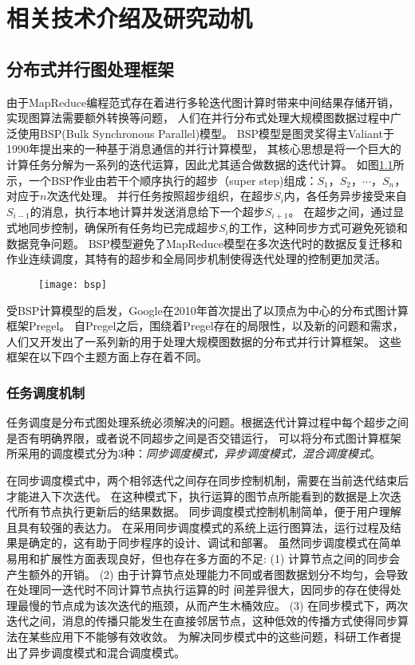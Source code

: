 \chapter{相关技术介绍及研究动机}
\section{分布式并行图处理框架}
由于MapReduce编程范式存在着进行多轮迭代图计算时带来中间结果存储开销，实现图算法需要额外转换等问题，
人们在并行分布式处理大规模图数据过程中广泛使用BSP(Bulk Synchronous Parallel)模型\cite{bsp@1990}。
BSP模型是图灵奖得主Valiant于1990年提出来的一种基于消息通信的并行计算模型，
其核心思想是将一个巨大的计算任务分解为一系列的迭代运算，因此尤其适合做数据的迭代计算。
如图\ref{fig:bsp}所示，一个BSP作业由若干个顺序执行的超步（super step)组成：$S_1，S_2，\cdots，S_n$，对应于$n$次迭代处理。
并行任务按照超步组织，在超步$S_i$内，各任务异步接受来自$S_{i-1}$的消息，执行本地计算并发送消息给下一个超步$S_{i+1}$。
在超步之间，通过显式地同步控制，确保所有任务均已完成超步$S_i$的工作，这种同步方式可避免死锁和数据竞争问题。
BSP模型避免了MapReduce模型在多次迭代时的数据反复迁移和作业连续调度，其特有的超步和全局同步机制使得迭代处理的控制更加灵活。

\begin{figure}[!htbp]
  \centering
  \texttt{[image: bsp]}
  \label{fig:bsp}
\end{figure}

受BSP计算模型的启发，Google在2010年首次提出了以顶点为中心的分布式图计算框架Pregel\cite{Malewicz@SIGMOD10}。
自Pregel之后，围绕着Pregel存在的局限性，以及新的问题和需求，人们又开发出了一系列新的用于处理大规模图数据的分布式并行计算框架。
这些框架在以下四个主题方面上存在着不同。

\subsection{任务调度机制}
任务调度是分布式图处理系统必须解决的问题。根据迭代计算过程中每个超步之间是否有明确界限，或者说不同超步之间是否交错运行，
可以将分布式图计算框架所采用的调度模式分为3种：\textit{同步调度模式，异步调度模式，混合调度模式}。

在同步调度模式中，两个相邻迭代之间存在同步控制机制，需要在当前迭代结束后才能进入下次迭代。
在这种模式下，执行运算的图节点所能看到的数据是上次迭代所有节点执行更新后的结果数据。
同步调度模式控制机制简单，便于用户理解且具有较强的表达力。
在采用同步调度模式的系统上运行图算法，运行过程及结果是确定的，这有助于同步程序的设计、调试和部署。    
虽然同步调度模式在简单易用和扩展性方面表现良好，但也存在多方面的不足:
(1) 计算节点之间的同步会产生额外的开销。
(2) 由于计算节点处理能力不同或者图数据划分不均匀，会导致在处理同一迭代时不同计算节点执行运算的时
间差异很大，因同步的存在使得处理最慢的节点成为该次迭代的瓶颈，从而产生木桶效应。
(3) 在同步模式下，两次迭代之间，消息的传播只能发生在直接邻居节点，这种低效的传播方式使得同步算法在某些应用下不能够有效收敛。
为解决同步模式中的这些问题，科研工作者提出了异步调度模式和混合调度模式。

